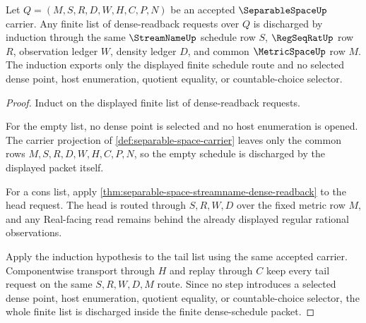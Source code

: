 \begin{theorem}
\label{thm:separable-space-finite-dense-schedule-induction}
Let $Q=(M,S,R,D,W,H,C,P,N)$ be an accepted $\SeparableSpaceUp$ carrier. Any
finite list of dense-readback requests over $Q$ is discharged by induction
through the same $\StreamNameUp$ schedule row $S$, $\RegSeqRatUp$ row $R$,
observation ledger $W$, density ledger $D$, and common $\MetricSpaceUp$ row
$M$. The induction exports only the displayed finite schedule route and no
selected dense point, host enumeration, quotient equality, or countable-choice
selector.
\end{theorem}
\begin{proof}
Induct on the displayed finite list of dense-readback requests.

For the empty list, no dense point is selected and no host enumeration is
opened. The carrier projection of \autoref{def:separable-space-carrier} leaves
only the common rows $M,S,R,D,W,H,C,P,N$, so the empty schedule is discharged
by the displayed packet itself.

For a cons list, apply
\autoref{thm:separable-space-streamname-dense-readback} to the head request.
The head is routed through $S,R,W,D$ over the fixed metric row $M$, and any
Real-facing read remains behind the already displayed regular rational
observations.

Apply the induction hypothesis to the tail list using the same accepted carrier.
Componentwise transport through $H$ and replay through $C$ keep every tail
request on the same $S,R,W,D,M$ route. Since no step introduces a selected
dense point, host enumeration, quotient equality, or countable-choice selector,
the whole finite list is discharged inside the finite dense-schedule packet.
\end{proof}

